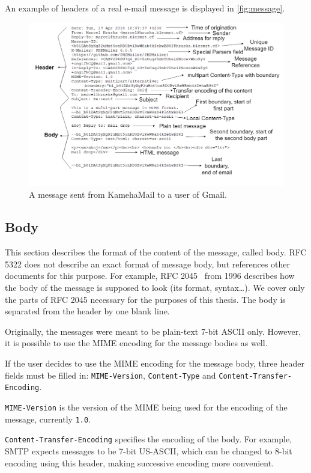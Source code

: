 An example of headers of a real e-mail message is displayed in \autoref{fig:message}.
\begin{figure}
\centering
\includegraphics[width=\textwidth]{img/message_example.png}
\caption{A message sent from KamehaMail to a user of Gmail.}
\label{fig:message}
\end{figure}

\subsection{Body}
This section describes the format of the content of the message, called body.
RFC 5322 does not describe an exact format of message body, but references other documents for this purpose. For example, RFC 2045~\cite{rfc2045} from 1996 describes how the body of the message is supposed to look (its format, syntax\dots). We cover only the parts of RFC 2045 necessary for the purposes of this thesis.
The body is separated from the header by one blank line.

Originally, the messages were meant to be plain-text 7-bit ASCII only. However, it is possible to use the MIME encoding for the message bodies as well. 

If the user decides to use the MIME encoding for the message body, three header fields must be filled in: \texttt{MIME-Version}, \texttt{Content-Type} and \texttt{Content-Transfer-Encoding}.

\texttt{MIME-Version} is the version of the MIME being used for the encoding of the message, currently \texttt{1.0}.

\texttt{Content-Transfer-Encoding} specifies the encoding of the body. For example, SMTP expects messages to be 7-bit US-ASCII, which can be changed to 8-bit encoding using this header, making successive encoding more convenient.

